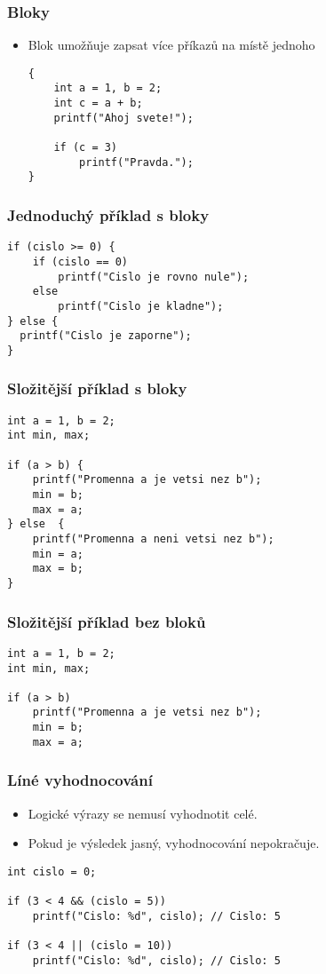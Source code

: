 \documentclass{beamer}
\newenvironment{itemizex}%
  {\large \begin{itemize}%
    \setlength{\itemsep}{8pt}%
    \setlength{\parskip}{8pt}}%
  {\end{itemize}}
\begin{document}
\begin{frame}[t,fragile]\frametitle{Bloky} 
  \begin{itemizex}
    \item Blok umožňuje zapsat více příkazů na místě jednoho
    \begin{verbatim} 
{
    int a = 1, b = 2;
    int c = a + b;
    printf("Ahoj svete!");

    if (c = 3)
        printf("Pravda.");
}
    \end{verbatim}
  \end{itemizex}
\end{frame}


\begin{frame}[t,fragile]\frametitle{Jednoduchý příklad s bloky} 
  \begin{verbatim} 
if (cislo >= 0) {
    if (cislo == 0)
        printf("Cislo je rovno nule");
    else 
        printf("Cislo je kladne");
} else {
  printf("Cislo je zaporne");
}
  \end{verbatim}
\end{frame}


\begin{frame}[t,fragile]\frametitle{Složitější příklad s bloky} 
  \begin{verbatim} 
int a = 1, b = 2;
int min, max;

if (a > b) {
    printf("Promenna a je vetsi nez b");
    min = b;
    max = a;
} else  {
    printf("Promenna a neni vetsi nez b");
    min = a;
    max = b;
}
  \end{verbatim}
\end{frame}


\begin{frame}[t,fragile]\frametitle{Složitější příklad bez bloků} 
  \begin{verbatim} 
int a = 1, b = 2;
int min, max;

if (a > b) 
    printf("Promenna a je vetsi nez b");
    min = b;
    max = a;
  \end{verbatim}
\end{frame}



\begin{frame}[t,fragile]\frametitle{Líné vyhodnocování} 
  \begin{itemizex}
    \item Logické výrazy se nemusí vyhodnotit celé.
    \item Pokud je výsledek jasný, vyhodnocování nepokračuje.
  \end{itemizex}
  \begin{verbatim} 
int cislo = 0;

if (3 < 4 && (cislo = 5)) 
    printf("Cislo: %d", cislo); // Cislo: 5

if (3 < 4 || (cislo = 10))
    printf("Cislo: %d", cislo); // Cislo: 5

  \end{verbatim}
\end{frame}
\end{document}

